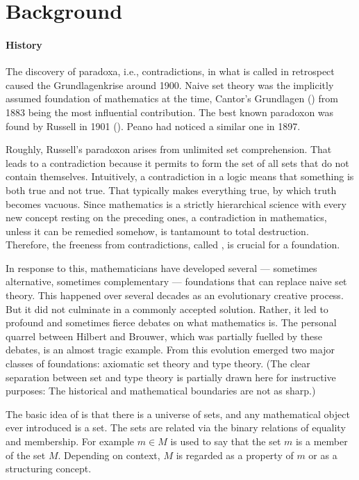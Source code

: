\section{Background}

\paragraph{History}
The discovery of paradoxa, i.e., contradictions, in what is called  in retrospect caused the Grundlagenkrise around 1900. Naive set theory was the implicitly assumed foundation of mathematics at the time, Cantor's Grundlagen (\cite{grundlagen}) from 1883 being the most influential contribution. The best known paradoxon was found by Russell in 1901 (\cite{russellparadox}). Peano had noticed a similar one in 1897.

Roughly, Russell's paradoxon arises from unlimited set comprehension. That leads to a contradiction because it permits to form the set of all sets that do not contain themselves. Intuitively, a contradiction in a logic means that something is both true and not true. That typically makes everything true, by which truth becomes vacuous. Since mathematics is a strictly hierarchical science with every new concept resting on the preceding ones, a contradiction in mathematics, unless it can be remedied somehow, is tantamount to total destruction. Therefore, the freeness from contradictions, called , is crucial for a foundation.

In response to this, mathematicians have developed several --- sometimes alternative, sometimes complementary --- foundations that can replace naive set theory. This happened over several decades as an evolutionary creative process. But it did not culminate in a commonly accepted solution. Rather, it led to profound and sometimes fierce debates on what mathematics is. The personal quarrel between Hilbert and Brouwer, which was partially fuelled by these debates, is an almost tragic example. From this evolution emerged two major classes of foundations: axiomatic set theory and type theory. (The clear separation between set and type theory is partially drawn here for instructive purposes: The historical and mathematical boundaries are not as sharp.)

The basic idea of  is that there is a universe of sets, and any mathematical object ever introduced is a set. The sets are related via the binary relations of equality and membership. For example $m\in M$ is used to say that the set $m$ is a member of the set $M$. Depending on context, $M$ is regarded as a property of $m$ or as a structuring concept.

